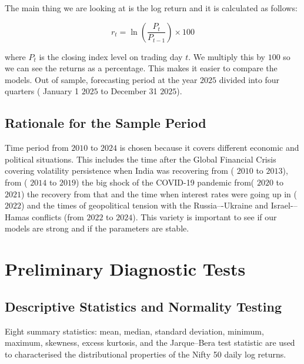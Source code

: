 \newpage 
The main thing we are looking at is the log return and it is calculated as follows:



\begin{equation}
   r_t = \ln \left( \frac{P_t}{P_{t-1}} \right)\times100
\end{equation}



where $P_t$ is the closing index level on trading day $t$. We multiply this by $100$ so we can see the returns as a percentage. This makes it easier to compare the models. Out of sample, forecasting period  at the year $2025$ divided into four quarters ( January 1 $2025$ to December 31 $2025$).

\vspace{1.5cm}

\subsection{Rationale for the Sample Period}

Time period from $2010$ to $2024$ is chosen because it covers different economic and political situations. This includes the time after the Global Financial Crisis covering volatility persistence when India was recovering from ( $2010$ to $2013$), from ( $2014$ to $2019$) the big shock of the COVID-19 pandemic from( $2020$ to $2021$) the recovery from that and the time when interest rates were going up in ( $2022$) and the times of geopolitical tension with the Russia–-Ukraine and Israel-–Hamas conflicts (from $2022$ to $2024$). This variety is important to see if our models are strong and if the parameters are stable.

\vspace{1.5cm}

\section{Preliminary Diagnostic Tests}

\subsection{Descriptive Statistics and Normality Testing}

Eight summary 
statistics: mean, median, standard deviation, minimum, 
maximum, skewness, excess kurtosis, and the 
Jarque--Bera test statistic are used to characterised the distributional properties of the Nifty 50 daily 
log returns. 

